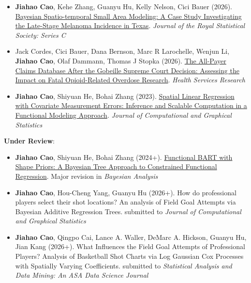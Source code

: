 \documentclass[letterpaper,11pt]{article}
\begin{document}
\begin{itemize}
    \item \textbf{Jiahao Cao}, Kehe Zhang, Guanyu Hu, Kelly Nelson, Cici Bauer (2026). \href{https://doi.org/10.1093/jrsssc/qlaf054}{Bayesian Spatio-temporal Small Area Modeling: A Case Study Investigating the Late-Stage Melanoma Incidence in Texas}. \textit{Journal of the Royal Statistical Society: Series C}
    \item Jack Cordes, Cici Bauer, Dana Bernson, Marc R Larochelle, Wenjun Li, \textbf{Jiahao Cao}, Olaf Dammann, Thomas J Stopka (2026). \href{https://onlinelibrary.wiley.com/doi/full/10.1111/1475-6773.70097}{The All-Payer Claims Database After the Gobeille Supreme Court Decision: Assessing the Impact on Fatal Opioid-Related Overdose Research}. \textit{Health Services Research}
    \item \textbf{Jiahao Cao}, Shiyuan He, Bohai Zhang (2023). \href{https://www.tandfonline.com/doi/abs/10.1080/10618600.2023.2175686}{Spatial Linear Regression with Covariate Measurement Errors: Inference and Scalable Computation in a Functional Modeling Approach}. \textit{Journal of Computational and Graphical Statistics}
\end{itemize}


\textbf{Under Review}:

\begin{itemize}
    \item \textbf{Jiahao Cao}, Shiyuan He, Bohai Zhang (2024+). \href{https://arxiv.org/abs/2502.16888}{Functional BART with Shape Priors: A Bayesian Tree Approach to Constrained Functional Regression}. Major revision in \textit{Bayesian Analysis}
    \item \textbf{Jiahao Cao}, Hou-Cheng Yang, Guanyu Hu (2026+). How do professional players select their shot locations? An analysis of Field Goal Attempts via Bayesian Additive Regression Trees. submitted to \textit{Journal of Computational and Graphical Statistics}
    \item \textbf{Jiahao Cao}, Qingpo Cai, Lance A. Waller, DeMarc A. Hickson, Guanyu Hu, Jian Kang (2026+). What Influences the Field Goal Attempts of Professional Players? Analysis of Basketball Shot Charts via Log Gaussian Cox Processes with Spatially Varying Coefficients. submitted to \textit{Statistical Analysis and Data Mining: An ASA Data Science Journal}
    
\end{itemize}
\end{document}
